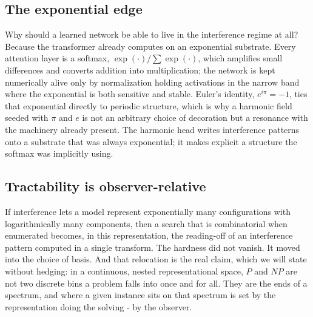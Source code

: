 \subsection{The exponential edge}

Why should a learned network be able to live in the interference regime at all? Because the transformer already computes on an exponential substrate. Every attention layer is a softmax, $\exp(\cdot)/\sum\exp(\cdot)$, which amplifies small differences and converts addition into multiplication; the network is kept numerically alive only by normalization holding activations in the narrow band where the exponential is both sensitive and stable. Euler's identity, $e^{i\pi} = -1$, ties that exponential directly to periodic structure, which is why a harmonic field seeded with $\pi$ and $e$ is not an arbitrary choice of decoration but a resonance with the machinery already present. The harmonic head writes interference patterns onto a substrate that was always exponential; it makes explicit a structure the softmax was implicitly using.

\paperFramingEdge

\subsection{Tractability is observer-relative}

If interference lets a model represent exponentially many configurations with logarithmically many components, then a search that is combinatorial when enumerated becomes, in this representation, the reading-off of an interference pattern computed in a single transform. The hardness did not vanish. It moved into the choice of basis. And that relocation is the real claim, which we will state without hedging: in a continuous, nested representational space, $P$ and $NP$ are not two discrete bins a problem falls into once and for all. They are the ends of a spectrum, and where a given instance sits on that spectrum is set by the representation doing the solving - by the observer.

